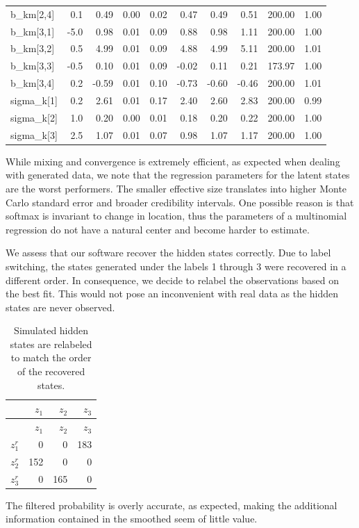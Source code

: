 \documentclass[]{article}
\begin{document}
\begin{longtable}[]{@{}lrrrrrrrrr@{}}
b\_km{[}2,4{]} & 0.1 & 0.49 & 0.00 & 0.02 & 0.47 & 0.49 & 0.51 & 200.00
& 1.00\tabularnewline
b\_km{[}3,1{]} & -5.0 & 0.98 & 0.01 & 0.09 & 0.88 & 0.98 & 1.11 & 200.00
& 1.00\tabularnewline
b\_km{[}3,2{]} & 0.5 & 4.99 & 0.01 & 0.09 & 4.88 & 4.99 & 5.11 & 200.00
& 1.01\tabularnewline
b\_km{[}3,3{]} & -0.5 & 0.10 & 0.01 & 0.09 & -0.02 & 0.11 & 0.21 &
173.97 & 1.00\tabularnewline
b\_km{[}3,4{]} & 0.2 & -0.59 & 0.01 & 0.10 & -0.73 & -0.60 & -0.46 &
200.00 & 1.01\tabularnewline
sigma\_k{[}1{]} & 0.2 & 2.61 & 0.01 & 0.17 & 2.40 & 2.60 & 2.83 & 200.00
& 0.99\tabularnewline
sigma\_k{[}2{]} & 1.0 & 0.20 & 0.00 & 0.01 & 0.18 & 0.20 & 0.22 & 200.00
& 1.00\tabularnewline
sigma\_k{[}3{]} & 2.5 & 1.07 & 0.01 & 0.07 & 0.98 & 1.07 & 1.17 & 200.00
& 1.00\tabularnewline
\bottomrule
\end{longtable}

While mixing and convergence is extremely efficient, as expected when
dealing with generated data, we note that the regression parameters for
the latent states are the worst performers. The smaller effective size
translates into higher Monte Carlo standard error and broader
credibility intervals. One possible reason is that softmax is invariant
to change in location, thus the parameters of a multinomial regression
do not have a natural center and become harder to estimate.

We assess that our software recover the hidden states correctly. Due to
label switching, the states generated under the labels 1 through 3 were
recovered in a different order. In consequence, we decide to relabel the
observations based on the best fit. This would not pose an inconvenient
with real data as the hidden states are never observed.

\begin{longtable}[]{@{}lrrr@{}}
\caption{Simulated hidden states are relabeled to match the order of the
recovered states.}\tabularnewline
\toprule
& \(z_1\) & \(z_2\) & \(z_3\)\tabularnewline
\midrule
\endfirsthead
\toprule
& \(z_1\) & \(z_2\) & \(z_3\)\tabularnewline
\midrule
\endhead
\(z^r_1\) & 0 & 0 & 183\tabularnewline
\(z^r_2\) & 152 & 0 & 0\tabularnewline
\(z^r_3\) & 0 & 165 & 0\tabularnewline
\bottomrule
\end{longtable}

The filtered probability is overly accurate, as expected, making the
additional information contained in the smoothed seem of little value.
\end{document}
